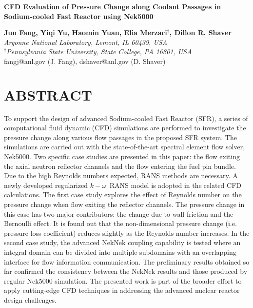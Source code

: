 \documentclass[11pt,letterpaper,english]{article}
\begin{document}
\vspace*{-0.45in}
\begin{center}
{\Large\centering\bf CFD Evaluation of Pressure Change along Coolant Passages in Sodium-cooled Fast Reactor using Nek5000}

\vspace{3pt}

\begin{spacing}{1}
{\bf \large Jun Fang, Yiqi Yu, Haomin Yuan, Elia Merzari$^\dagger$, Dillon R. Shaver} \\
\large \textit{Argonne National Laboratory, Lemont, IL 60439, USA} \\
\large \textit{$^\dagger$Pennsylvania State University, State College, PA 16801, USA} \\
{\color{brown} fangj@anl.gov (J. Fang), dshaver@anl.gov (D. Shaver)}
\end{spacing}
\vspace{10pt}

\end{center}

\normalsize

\section*{ABSTRACT}

To support the design of advanced Sodium-cooled Fast Reactor (SFR), a series of computational fluid dynamic (CFD) simulations are performed to investigate the pressure change along various flow passages in the proposed SFR system. 
The simulations are carried out with the state-of-the-art spectral element flow solver, Nek5000. 
Two specific case studies are presented in this paper: the flow exiting the axial neutron reflector channels and the flow entering the fuel pin bundle. 
Due to the high Reynolds numbers expected, RANS methods are necessary. 
A newly developed regularized $k-\omega$\ RANS model is adopted in the related CFD calculations. 
The first case study explores the effect of Reynolds number on the pressure change when flow exiting the reflector channels. 
The pressure change in this case has two major contributors: the change due to wall friction and the Bernoulli effect. 
It is found out that the non-dimensional pressure change (i.e. 
pressure loss coefficient) reduces slightly as the Reynolds number increases. 
In the second case study, the advanced NekNek coupling capability is tested where an integral domain can be divided into multiple subdomains with an overlapping interface for flow information communication. 
The preliminary results obtained so far confirmed the consistency between the NekNek results and those produced by regular Nek5000 simulation. 
The presented work is part of the broader effort to apply cutting-edge CFD techniques in addressing the advanced nuclear reactor design challenges.
\end{document}
